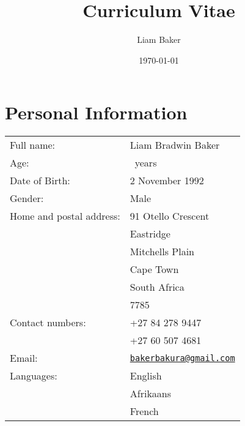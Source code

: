\documentclass{article}
\author{Liam Baker}
\title{Curriculum Vitae}
\date{\today}
\newcommand{\email}[1]{\href{mailto:#1}{\texttt{#1}}}
\begin{document}
 \maketitle


\section{Personal Information}
\begin{center} \begin{tabular}{ll}
	Full name: 								& Liam Bradwin Baker \\
	Age: 											& \myyears~years \\
	Date of Birth:						& 2 November 1992 \\
	Gender: 									& Male \\
	Home and postal address:	& 91 Otello Crescent \\
														& Eastridge \\
														& Mitchells Plain \\
														& Cape Town \\
														& South Africa \\
														& 7785 \\
	Contact numbers:					& +27 84 278 9447 \\
														& +27 60 507 4681 \\
	Email:										& \email{bakerbakura@gmail.com} \\
	Languages:								& English \\
														& \footnotesize{Afrikaans} \\
														& \tiny{French} \\
\end{tabular} \end{center}
\end{document}
